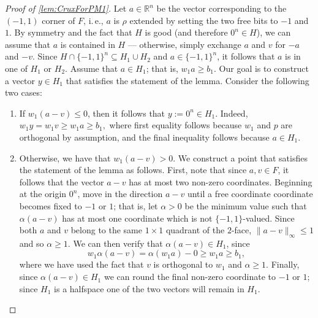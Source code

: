 \documentclass[11pt]{article}
\numberwithin{equation}{section}
\theoremstyle{definition}
\theoremstyle{plain}
\newcommand{\ie}{i.\,e.}
\newcounter{cor}\renewcommand{\thecor}{1.1.\arabic{cor}}\newenvironment{cor}{\ifnum\value{cor}=0\refstepcounter{cor}\else\PackageError{toc-native-compat}{Unsupported additional cor envelope}{Only the one exact source-observed cor paragraph is allowed.}\fi}{}\providecommand{\corautorefname}{Theorem}
\newcommand{\set}[1]{\{ #1 \}}
\begin{document}
\begin{proof}[Proof of \autoref{lem:CruxForPM1}]
	Let $a \in \mathbb{R}^n$ be the vector corresponding to the $(-1,1)$ corner of $F$, \ie,  $a$ is $\rho$ extended by setting the two free bits to $-1$ and $1$. By symmetry and the fact that $H$ is good (and therefore $0^n \in H$), we can assume that $a$ is contained in $H$ --- otherwise, simply exchange $a$ and $v$ for $-a$ and $-v$.
	Since $H \cap \set{-1, 1}^n \subseteq H_1 \cup H_2$ and $a \in \set{-1,1}^n$, it follows that $a$ is in one of $H_1$ or $H_2$.  
	Assume that $a \in H_1$; that is, $w_1a \geq b_1$.
	Our goal is to construct a vector $y \in H_1$ that satisfies the statement of the lemma. Consider the following two cases:
	\begin{enumerate}
		\item[(i)] If $w_1( a-v) \leq 0$, then it follows that  $y := 0^n \in H_1$. Indeed,
	$w_1 y = w_1v \geq w_1 a \geq b_1,$
	where first equality follows because $w_1$ and $p$ are orthogonal by assumption, and the final inequality follows because $a \in H_1$. 
		\item[(ii)] Otherwise, we have that $w_1(a-v) > 0$. 
			We construct a point that satisfies the statement of the lemma as follows.
			First, note that since $a, v \in F$, it follows that the vector $a - v$ has at most two non-zero coordinates.
			Beginning at the origin $0^n$, move in the direction $a-v$ until a free coordinate coordinate becomes fixed to $-1$ or $1$; that is, let $\alpha>0$ be the minimum value such that $\alpha(a-v)$ has at most one coordinate which is not $\{-1,1\}$-valued.
			Since both $a$ and $v$ belong to the same $1 \times 1$ quadrant of the $2$-face, $\|a-v\|_{\infty} \leq 1$ and so $\alpha \geq 1$.
			We can then verify that $\alpha(a-v) \in H_1$, since
			\[w_1 \alpha(a-v) = \alpha(w_1a) - 0 \geq w_1a \geq b_1,\]
			where we have used the fact that $v$ is orthogonal to $w_1$ and $\alpha \geq 1$.	
			Finally, since $\alpha(a - v) \in H_1$ we can round the final non-zero coordinate to $-1$ or $1$; since $H_1$ is a halfspace one of the two vectors will remain in $H_1$.    \qedhere  %
	\end{enumerate}
%
\end{proof}
\end{document}
